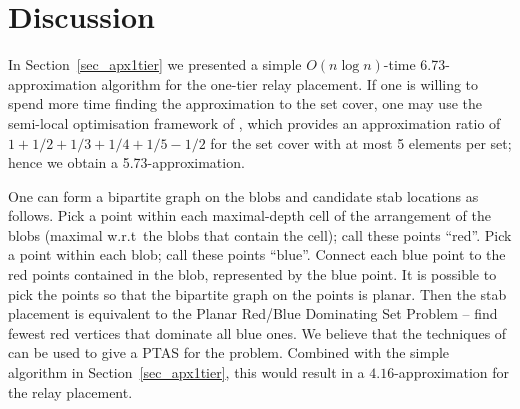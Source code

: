 \documentclass[11pt,a4paper]{article}
\theoremstyle{definition}
\theoremstyle{remark}
\begin{document}
\section{Discussion}

In Section~\ref{sec_apx1tier} we presented a simple $O(n\log n)$-time 6.73-approximation algorithm for the one-tier relay placement.  If one is willing to spend more time finding the approximation to the set cover, one may use the semi-local optimisation framework of \citet{duh97approximation}, which provides an approximation ratio of $1+1/2+1/3+1/4+1/5-1/2$ for the set cover with at most 5 elements per set; hence we obtain a 5.73-approximation.

One can form a bipartite graph on the blobs and candidate stab locations as follows.  Pick a point within each maximal-depth cell of the arrangement of the blobs (maximal w.r.t\ the blobs that contain the cell); call these points ``red''.  Pick a point within each blob; call these points ``blue''.  Connect each blue point to the red points contained in the blob, represented by the blue point.  It is possible to pick the points so that the bipartite graph on the points is planar.  Then the stab placement is equivalent to the Planar Red/Blue Dominating Set Problem \cite{downey99parameterized} -- find fewest red vertices that dominate all blue ones.  We believe that the techniques of \citet{baker94approximation} can be used to give a PTAS for the problem.  Combined with the simple algorithm in Section~\ref{sec_apx1tier}, this would result in a $4.16$-approximation for the relay placement.
\end{document}
